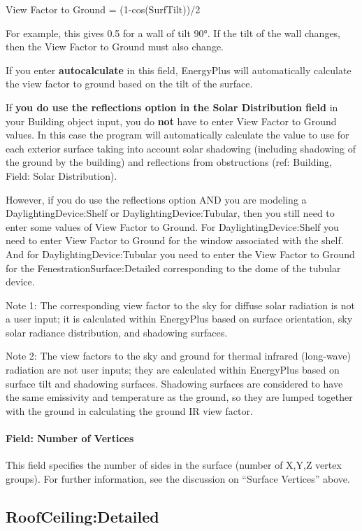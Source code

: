 View Factor to Ground = (1-cos(SurfTilt))/2

For example, this gives 0.5 for a wall of tilt 90°. If the tilt of the wall changes, then the View Factor to Ground must also change.

If you enter \textbf{autocalculate} in this field, EnergyPlus will automatically calculate the view factor to ground based on the tilt of the surface.

If \textbf{you do use the reflections option in the Solar Distribution field} in your Building object input, you do \textbf{not} have to enter View Factor to Ground values. In this case the program will automatically calculate the value to use for each exterior surface taking into account solar shadowing (including shadowing of the ground by the building) and reflections from obstructions (ref: Building, Field: Solar Distribution).

However, if you do use the reflections option AND you are modeling a DaylightingDevice:Shelf or DaylightingDevice:Tubular, then you still need to enter some values of View Factor to Ground. For DaylightingDevice:Shelf you need to enter View Factor to Ground for the window associated with the shelf. And for DaylightingDevice:Tubular you need to enter the View Factor to Ground for the FenestrationSurface:Detailed corresponding to the dome of the tubular device.

Note 1: The corresponding view factor to the sky for diffuse solar radiation is not a user input; it is calculated within EnergyPlus based on surface orientation, sky solar radiance distribution, and shadowing surfaces.

Note 2: The view factors to the sky and ground for thermal infrared (long-wave) radiation are not user inputs; they are calculated within EnergyPlus based on surface tilt and shadowing surfaces. Shadowing surfaces are considered to have the same emissivity and temperature as the ground, so they are lumped together with the ground in calculating the ground IR view factor.

\paragraph{Field: Number of Vertices}\label{field-number-of-vertices}

This field specifies the number of sides in the surface (number of X,Y,Z vertex groups). For further information, see the discussion on ``Surface Vertices'' above.

\subsection{RoofCeiling:Detailed}\label{roofceilingdetailed}

